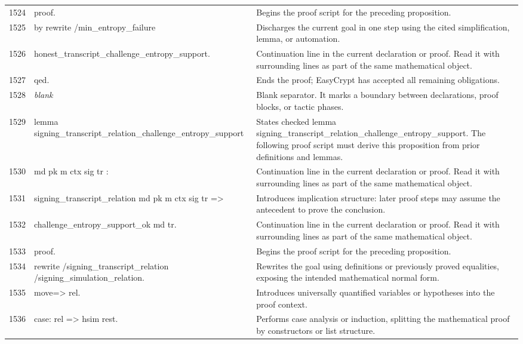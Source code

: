 \documentclass[10pt]{article}
\begin{document}
\begin{longtable}{r L{0.53\textwidth} L{0.37\textwidth}}
1524 & {\ttfamily\scriptsize proof.} & Begins the proof script for the preceding proposition. \\
1525 & {\ttfamily\scriptsize by rewrite /min\_entropy\_failure} & Discharges the current goal in one step using the cited simplification, lemma, or automation. \\
1526 & {\ttfamily\scriptsize    honest\_transcript\_challenge\_entropy\_support.} & Continuation line in the current declaration or proof.  Read it with surrounding lines as part of the same mathematical object. \\
1527 & {\ttfamily\scriptsize qed.} & Ends the proof; EasyCrypt has accepted all remaining obligations. \\
1528 & {\ttfamily\scriptsize \emph{blank}} & Blank separator.  It marks a boundary between declarations, proof blocks, or tactic phases. \\
1529 & {\ttfamily\scriptsize lemma signing\_transcript\_relation\_challenge\_entropy\_support} & States checked lemma signing\_transcript\_relation\_challenge\_entropy\_support.  The following proof script must derive this proposition from prior definitions and lemmas. \\
1530 & {\ttfamily\scriptsize   md pk m ctx sig tr :} & Continuation line in the current declaration or proof.  Read it with surrounding lines as part of the same mathematical object. \\
1531 & {\ttfamily\scriptsize   signing\_transcript\_relation md pk m ctx sig tr =>} & Introduces implication structure: later proof steps may assume the antecedent to prove the conclusion. \\
1532 & {\ttfamily\scriptsize   challenge\_entropy\_support\_ok md tr.} & Continuation line in the current declaration or proof.  Read it with surrounding lines as part of the same mathematical object. \\
1533 & {\ttfamily\scriptsize proof.} & Begins the proof script for the preceding proposition. \\
1534 & {\ttfamily\scriptsize rewrite /signing\_transcript\_relation /signing\_simulation\_relation.} & Rewrites the goal using definitions or previously proved equalities, exposing the intended mathematical normal form. \\
1535 & {\ttfamily\scriptsize move=> rel.} & Introduces universally quantified variables or hypotheses into the proof context. \\
1536 & {\ttfamily\scriptsize case: rel => hsim rest.} & Performs case analysis or induction, splitting the mathematical proof by constructors or list structure. \\

\end{longtable}
\end{document}
